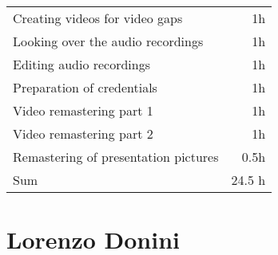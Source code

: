 \begin{table}[h!tpb]
\begin{tabularx}{\textwidth}{X r}
      Creating videos for video gaps & 1h \\
      Looking over the audio recordings & 1h \\
      Editing audio recordings & 1h \\
      Preparation of credentials & 1h \\
      Video remastering part 1 & 1h \\
      Video remastering part 2 & 1h \\
      Remastering of presentation pictures & 0.5h \\
    \midrule
      Sum & 24.5 h \\
    \bottomrule
  \end{tabularx}
\end{table}

\clearpage
\section*{Lorenzo Donini}
